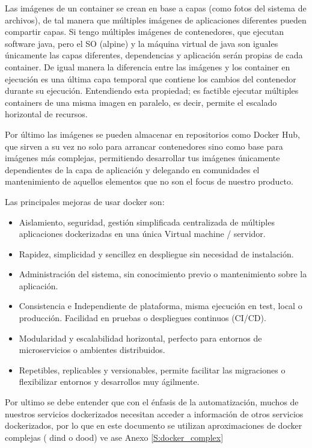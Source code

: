 Las imágenes de un container se crean en base a capas (como fotos del sistema de archivos), de tal manera que múltiples imágenes de aplicaciones diferentes pueden compartir capas. Si tengo múltiples imágenes de contenedores, que ejecutan software java, pero el SO (alpine) y la máquina virtual de java son iguales únicamente las capas diferentes, dependencias y aplicación serán propias de cada container. De igual manera la diferencia entre las imágenes y los container en ejecución es una última capa temporal que contiene los cambios del contenedor durante su ejecución. Entendiendo esta propiedad; es factible ejecutar múltiples containers de una misma imagen en paralelo, es decir, permite el escalado horizontal de recursos.

Por último las imágenes se pueden almacenar en repositorios como Docker Hub, que sirven a su vez no solo para arrancar contenedores sino como base para imágenes más complejas, permitiendo desarrollar tus imágenes únicamente dependientes de la capa de aplicación y delegando en comunidades el mantenimiento de aquellos elementos que no son el focus de nuestro producto.

Las principales mejoras de usar docker son:
\begin{itemize}
    \item Aislamiento, seguridad, gestión simplificada centralizada de múltiples aplicaciones dockerizadas en una única Virtual machine / servidor.
    \item Rapidez, simplicidad y sencillez en despliegue sin necesidad de instalación.
    \item Administración del sistema, sin conocimiento previo o mantenimiento sobre la aplicación.
    \item Consistencia e Independiente de plataforma, misma ejecución en test, local o producción. Facilidad en pruebas o despliegues continuos (CI/CD).
    \item Modularidad y escalabilidad horizontal, perfecto para entornos de microservicios o ambientes distribuidos.
    \item Repetibles, replicables y versionables, permite facilitar las migraciones o flexibilizar entornos y desarrollos muy ágilmente.
\end{itemize}

Por ultimo se debe entender que con el énfasis de la automatización, muchos de nuestros servicios dockerizados necesitan acceder a información de otros servicios dockerizados, por lo que en este documento se utilizan aproximaciones de docker complejas ( dind o dood) ve ase Anexo \ref{S:docker_complex}


